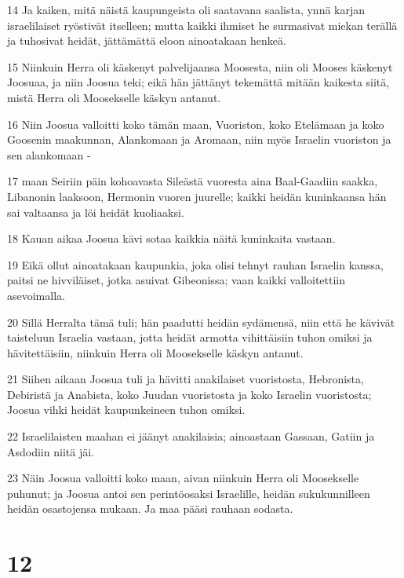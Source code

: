 \par 14 Ja kaiken, mitä näistä kaupungeista oli saatavana saalista, ynnä karjan israelilaiset ryöstivät itselleen; mutta kaikki ihmiset he surmasivat miekan terällä ja tuhosivat heidät, jättämättä eloon ainoatakaan henkeä.
\par 15 Niinkuin Herra oli käskenyt palvelijaansa Moosesta, niin oli Mooses käskenyt Joosuaa, ja niin Joosua teki; eikä hän jättänyt tekemättä mitään kaikesta siitä, mistä Herra oli Moosekselle käskyn antanut.
\par 16 Niin Joosua valloitti koko tämän maan, Vuoriston, koko Etelämaan ja koko Goosenin maakunnan, Alankomaan ja Aromaan, niin myös Israelin vuoriston ja sen alankomaan -
\par 17 maan Seiriin päin kohoavasta Sileästä vuoresta aina Baal-Gaadiin saakka, Libanonin laaksoon, Hermonin vuoren juurelle; kaikki heidän kuninkaansa hän sai valtaansa ja löi heidät kuoliaaksi.
\par 18 Kauan aikaa Joosua kävi sotaa kaikkia näitä kuninkaita vastaan.
\par 19 Eikä ollut ainoatakaan kaupunkia, joka olisi tehnyt rauhan Israelin kanssa, paitsi ne hivviläiset, jotka asuivat Gibeonissa; vaan kaikki valloitettiin asevoimalla.
\par 20 Sillä Herralta tämä tuli; hän paadutti heidän sydämensä, niin että he kävivät taisteluun Israelia vastaan, jotta heidät armotta vihittäisiin tuhon omiksi ja hävitettäisiin, niinkuin Herra oli Moosekselle käskyn antanut.
\par 21 Siihen aikaan Joosua tuli ja hävitti anakilaiset vuoristosta, Hebronista, Debiristä ja Anabista, koko Juudan vuoristosta ja koko Israelin vuoristosta; Joosua vihki heidät kaupunkeineen tuhon omiksi.
\par 22 Israelilaisten maahan ei jäänyt anakilaisia; ainoastaan Gassaan, Gatiin ja Asdodiin niitä jäi.
\par 23 Näin Joosua valloitti koko maan, aivan niinkuin Herra oli Moosekselle puhunut; ja Joosua antoi sen perintöosaksi Israelille, heidän sukukunnilleen heidän osastojensa mukaan. Ja maa pääsi rauhaan sodasta.

\chapter{12}


